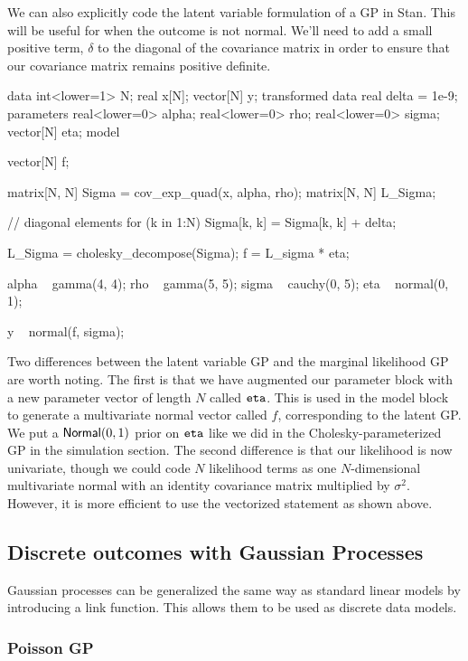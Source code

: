 We can also explicitly code the latent variable formulation of a GP in Stan.
This will be useful for when the outcome is not normal. We'll need to add a
small positive term, $\delta$ to the diagonal of the covariance matrix in order
to ensure that our covariance matrix remains positive definite.

%
\begin{stancode}
data {
  int<lower=1> N;
  real x[N];
  vector[N] y;
}
transformed data {
  real delta = 1e-9;
}
parameters {
  real<lower=0> alpha;
  real<lower=0> rho;
  real<lower=0> sigma;
  vector[N] eta;
}
model {
  vector[N] f;
  {
    matrix[N, N] Sigma = cov_exp_quad(x, alpha, rho);
    matrix[N, N] L_Sigma;

    // diagonal elements
    for (k in 1:N)
      Sigma[k, k] = Sigma[k, k] + delta; 

    L_Sigma = cholesky_decompose(Sigma);
    f = L_sigma * eta;
  }

  alpha ~ gamma(4, 4);
  rho ~ gamma(5, 5);
  sigma ~ cauchy(0, 5);
  eta ~ normal(0, 1);

  y ~ normal(f, sigma);
}
\end{stancode}
%

Two differences between the latent variable GP and the marginal likelihood GP
are worth noting. The first is that we have augmented our parameter block with
a new parameter vector of length $N$ called $\code{eta}$. This is used in the model
block to generate a multivariate normal vector called $f$, corresponding to the
latent GP. We put a $\distro{Normal}(0,1)$ prior on $\code{eta}$ like we did in the
Cholesky-parameterized GP in the simulation section.  The second difference is
that our likelihood is now univariate, though we could code $N$ likelihood
terms as one $N$-dimensional multivariate normal with an identity covariance
matrix multiplied by $\sigma^2$. However, it is more efficient to use the
vectorized statement as shown above.

\subsection{Discrete outcomes with Gaussian Processes}

Gaussian processes can be generalized the same way as standard linear
models by introducing a link function.  This allows them to be used as
discrete data models.

\subsubsection{Poisson GP}


